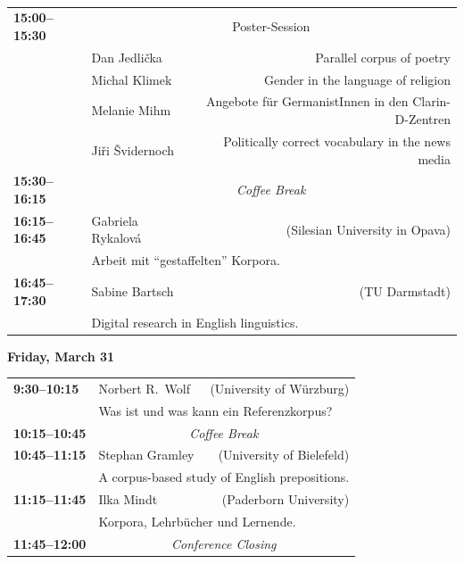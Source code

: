 \documentclass[a5paper,10pt,twoside]{article}%
\begin{document}
{\color{upbblue1}
\begin{center}
	\textbf{~}
\end{center}
\begin{tabular}{>{\bfseries}l>{}l>{}r} \midrule
	15:00--15:30 & \multicolumn{2}{c}{Poster-Session}\\ \cmidrule(lr){2-3}
	& Dan Jedli\v{c}ka & \multicolumn{1}{p{5.04cm}}{Parallel corpus of poetry}\\ \addlinespace[2pt]
	& Michal Klimek & \multicolumn{1}{p{5.04cm}}{Gender in the language of religion}\\ \addlinespace[2pt]
	& Melanie Mihm & \multicolumn{1}{p{5.04cm}}{Angebote f\"{u}r GermanistInnen in den Clarin-D-Zentren}\\ \addlinespace[2pt]
	& Ji\v{r}i \v{S}vidernoch & \multicolumn{1}{p{5.04cm}}{Politically correct vocabulary in the news media}\\ \midrule
	15:30--16:15 & \multicolumn{2}{c}{\textit{Coffee Break}}\\ \midrule
	16:15--16:45 & Gabriela Rykalov\'a & (Silesian University in Opava)\\ \cmidrule(l){2-3}
	& \multicolumn{2}{p{8.4cm}}{Arbeit mit ``gestaffelten'' Korpora.}\\ \midrule
	16:45--17:30 & Sabine Bartsch & (TU Darmstadt)\\ \cmidrule(l){2-3}
	& \multicolumn{2}{p{8.4cm}}{Digital research in English linguistics.}\\ \bottomrule
\end{tabular}
\vspace{1cm}
	\begin{center}
		\textbf{\Large Friday, March 31}
	\end{center}
\begin{tabular}{>{\bfseries}l>{}l>{}r} \midrule
	9:30--10:15 & Norbert R.~Wolf & (University of W\"{u}rzburg)\\ \cmidrule(l){2-3}
	& \multicolumn{2}{p{8.4cm}}{Was ist und was kann ein Referenzkorpus?}\\ \midrule
	10:15--10:45 & \multicolumn{2}{c}{\textit{Coffee Break}}\\ \midrule
	10:45--11:15 & Stephan Gramley & (University of Bielefeld)\\ \cmidrule(l){2-3}
	& \multicolumn{2}{p{8.4cm}}{A corpus-based study of English prepositions.}\\ \midrule
	11:15--11:45 & Ilka Mindt & (Paderborn University)\\ \cmidrule(l){2-3}
	& \multicolumn{2}{p{8.4cm}}{Korpora, Lehrb\"{u}cher und Lernende.}\\ \midrule
	11:45--12:00 & \multicolumn{2}{c}{\textit{Conference Closing}}\\ \bottomrule
\end{tabular}
\vspace{2cm}}
\end{document}
